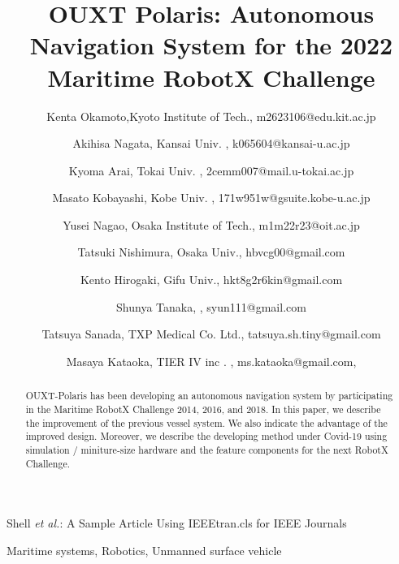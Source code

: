 \documentclass[lettersize,journal]{IEEEtran}
\begin{document}
\title{OUXT Polaris: Autonomous Navigation System for the 2022 Maritime RobotX Challenge}
\author{
    Kenta Okamoto,Kyoto Institute of Tech., m2623106@edu.kit.ac.jp \\ \and
    Akihisa Nagata, Kansai Univ. , k065604@kansai-u.ac.jp \\ \and
    Kyoma Arai, Tokai Univ. , 2cemm007@mail.u-tokai.ac.jp \\ \and
    Masato Kobayashi, Kobe Univ. , 171w951w@gsuite.kobe-u.ac.jp \\ \and
    Yusei Nagao, Osaka Institute of Tech., m1m22r23@oit.ac.jp \\ \and
    Tatsuki Nishimura, Osaka Univ., hbvcg00@gmail.com \\ \and
    Kento Hirogaki, Gifu Univ., hkt8g2r6kin@gmail.com \\ \and
    Shunya Tanaka, , syun111@gmail.com \\ \and
    Tatsuya Sanada, TXP Medical Co. Ltd., tatsuya.sh.tiny@gmail.com \\ \and
    Masaya Kataoka, TIER IV inc . , ms.kataoka@gmail.com,
}

%
{Shell \MakeLowercase{\textit{et al.}}: A Sample Article Using IEEEtran.cls for IEEE Journals}


\maketitle

\begin{abstract}
OUXT-Polaris has been developing an autonomous navigation system by participating in the 
Maritime RobotX Challenge 2014, 2016, and 2018. 
In this paper, we describe the improvement of the previous vessel system. 
We also indicate the advantage of the improved design.
Moreover, we describe the developing method under Covid-19 using simulation / miniture-size hardware and the 
feature components for the next RobotX Challenge.
\end{abstract}

\begin{IEEEkeywords}
Maritime systems, Robotics, Unmanned surface vehicle
\end{IEEEkeywords}
\end{document}
